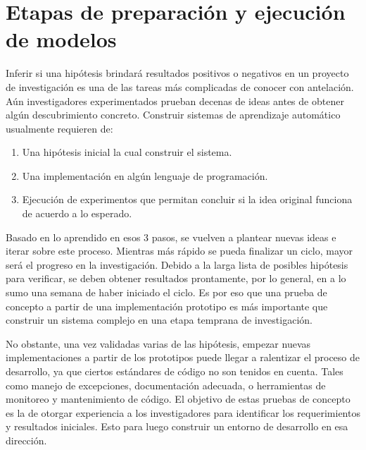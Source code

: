 \chapter{Etapas de preparación y ejecución de modelos}
\label{ch:method}

Inferir si una hipótesis brindará resultados positivos o negativos en un
proyecto de investigación es una de las tareas más complicadas de conocer con
antelación. Aún investigadores experimentados prueban decenas de ideas antes de
obtener algún descubrimiento concreto. Construir sistemas de aprendizaje
automático usualmente requieren de:

\begin{enumerate}
    \item Una hipótesis inicial la cual construir el sistema.
    \item Una implementación en algún lenguaje de programación.
    \item Ejecución de experimentos que permitan concluir si la idea original
    funciona de acuerdo a lo esperado.
\end{enumerate}

Basado en lo aprendido en esos 3 pasos, se vuelven a plantear nuevas ideas e
iterar sobre este proceso. Mientras más rápido se pueda finalizar un ciclo,
mayor será el progreso en la investigación. Debido a la larga lista de posibles
hipótesis para verificar, se deben obtener resultados prontamente, por lo
general, en a lo sumo una semana de haber iniciado el ciclo. Es por eso que una
prueba de concepto a partir de una implementación prototipo es más importante
que construir un sistema complejo en una etapa temprana de investigación.

No obstante, una vez validadas varias de las hipótesis, empezar nuevas
implementaciones a partir de los prototipos puede llegar a ralentizar el proceso
de desarrollo, ya que ciertos estándares de código no son tenidos en cuenta.
Tales como manejo de excepciones, documentación adecuada, o herramientas de
monitoreo y mantenimiento de código. El objetivo de estas pruebas de concepto es
la de otorgar experiencia a los investigadores para identificar los
requerimientos y resultados iniciales. Esto para luego construir un entorno de
desarrollo en esa dirección.

